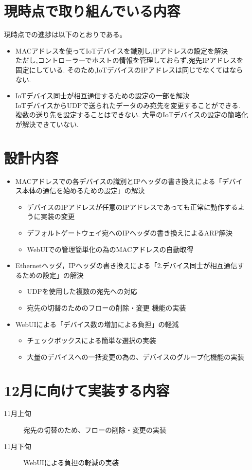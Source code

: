 \documentclass{jsarticle}
\begin{document}
\section{現時点で取り組んでいる内容}
	現時点での進捗は以下のとおりである。
	\begin{itemize}
		\item MACアドレスを使ってIoTデバイスを識別し,IPアドレスの設定を解決\\
			ただし,コントローラーでホストの情報を管理しておらず,宛先IPアドレスを固定にしている.
			そのため,IoTデバイスのIPアドレスは同じでなくてはならない.
		\item IoTデバイス同士が相互通信するための設定の一部を解決\\
			IoTデバイスからUDPで送られたデータのみ宛先を変更することができる.
			複数の送り先を設定することはできない.
			大量のIoTデバイスの設定の簡略化が解決できていない.
	\end{itemize}

\section{設計内容}

	\begin{itemize}
		\item MACアドレスでの各デバイスの識別とIPヘッダの書き換えによる「デバイス本体の通信を始めるための設定」の解決
			\begin{itemize}
				\item デバイスのIPアドレスが任意のIPアドレスであっても正常に動作するように実装の変更
				\item デフォルトゲートウェイ宛へのIPヘッダの書き換えによるARP解決
				\item WebUIでの管理簡単化の為のMACアドレスの自動取得
			\end{itemize}
		\item Ethernetヘッダ，IPヘッダの書き換えによる「2.デバイス同士が相互通信するための設定」の解決
			\begin{itemize}
				\item UDPを使用した複数の宛先への対応
				\item 宛先の切替のためのフローの削除・変更 機能の実装
			\end{itemize}
		\item WebUIによる「デバイス数の増加による負担」の軽減
			\begin{itemize}
				\item チェックボックスによる簡単な選択の実装
				\item 大量のデバイスへの一括変更の為の、デバイスのグループ化機能の実装
			\end{itemize}
	\end{itemize}

\section{12月に向けて実装する内容}
	\begin{description}
		\item[11月上旬] 宛先の切替のため、フローの削除・変更の実装
		\item[11月下旬] WebUIによる負担の軽減の実装
	\end{description}
	
\end{document}
